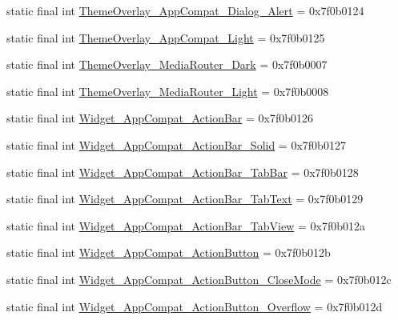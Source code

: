 \begin{CompactItemize}
\item 
static final int \hyperlink{classandroid_1_1support_1_1graphics_1_1drawable_1_1_r_1_1style_514974548c27d49c03179c7793e53cce}{ThemeOverlay\_\-AppCompat\_\-Dialog\_\-Alert} = 0x7f0b0124
\item 
static final int \hyperlink{classandroid_1_1support_1_1graphics_1_1drawable_1_1_r_1_1style_eff175c47178ff08f034b83d424a540b}{ThemeOverlay\_\-AppCompat\_\-Light} = 0x7f0b0125
\item 
static final int \hyperlink{classandroid_1_1support_1_1graphics_1_1drawable_1_1_r_1_1style_96e2d46382cfac8b91baf584c7b3ff41}{ThemeOverlay\_\-MediaRouter\_\-Dark} = 0x7f0b0007
\item 
static final int \hyperlink{classandroid_1_1support_1_1graphics_1_1drawable_1_1_r_1_1style_a2ac908dce32533181a31222274c7baa}{ThemeOverlay\_\-MediaRouter\_\-Light} = 0x7f0b0008
\item 
static final int \hyperlink{classandroid_1_1support_1_1graphics_1_1drawable_1_1_r_1_1style_6fc26322e2a3530915b890ef16e1221d}{Widget\_\-AppCompat\_\-ActionBar} = 0x7f0b0126
\item 
static final int \hyperlink{classandroid_1_1support_1_1graphics_1_1drawable_1_1_r_1_1style_50fae13f7bec5e641ce58a30ba885daa}{Widget\_\-AppCompat\_\-ActionBar\_\-Solid} = 0x7f0b0127
\item 
static final int \hyperlink{classandroid_1_1support_1_1graphics_1_1drawable_1_1_r_1_1style_1ed2dd627ee42ee75bfd516ff69e6c4e}{Widget\_\-AppCompat\_\-ActionBar\_\-TabBar} = 0x7f0b0128
\item 
static final int \hyperlink{classandroid_1_1support_1_1graphics_1_1drawable_1_1_r_1_1style_f170ecc2b178bf24c72c899462790dfa}{Widget\_\-AppCompat\_\-ActionBar\_\-TabText} = 0x7f0b0129
\item 
static final int \hyperlink{classandroid_1_1support_1_1graphics_1_1drawable_1_1_r_1_1style_cdfd6a0d31bdf57a1192df2711f2d974}{Widget\_\-AppCompat\_\-ActionBar\_\-TabView} = 0x7f0b012a
\item 
static final int \hyperlink{classandroid_1_1support_1_1graphics_1_1drawable_1_1_r_1_1style_3a55eb19afeff7f7bc8c67ae6eae972d}{Widget\_\-AppCompat\_\-ActionButton} = 0x7f0b012b
\item 
static final int \hyperlink{classandroid_1_1support_1_1graphics_1_1drawable_1_1_r_1_1style_1fa342f5caff588261a4c8437bd3a008}{Widget\_\-AppCompat\_\-ActionButton\_\-CloseMode} = 0x7f0b012c
\item 
static final int \hyperlink{classandroid_1_1support_1_1graphics_1_1drawable_1_1_r_1_1style_c10596e8fc3ea20793ea3500d2be2ba5}{Widget\_\-AppCompat\_\-ActionButton\_\-Overflow} = 0x7f0b012d

\end{CompactItemize}
